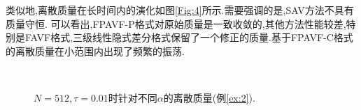 	类似地,离散质量在长时间内的演化如图\ref{Fig:4}所示.需要强调的是,SAV方法不具有质量守恒.
	可以看出,FPAVF-P格式对原始质量是一致收敛的,其他方法性能较差,特别是FAVF格式,三级线性隐式差分格式保留了一个修正的质量.基于FPAVF-C格式的离散质量在小范围内出现了频繁的振荡.
\begin{figure}[H]
	\begin{center}
	 \\
	 \caption{$N = 512,\tau=0.01$时针对不同$\alpha$的离散质量(例\ref{ex:2}).} \label{fig:4}
	\end{center}
	\end{figure}


